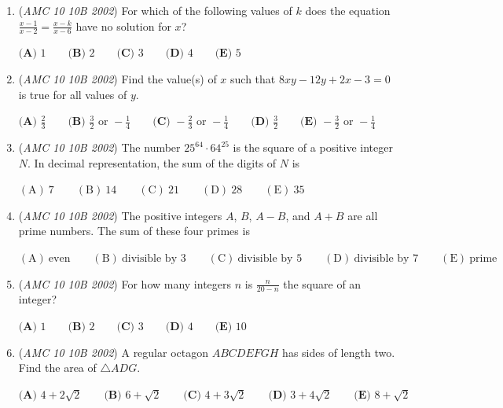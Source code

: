 \begin{enumerate}
 $\mathrm{(A) \ } 50\qquad \mathrm{(B) \ } 77\qquad \mathrm{(C) \ } 110\qquad \mathrm{(D) \ } 149\qquad \mathrm{(E) \ } 194$


	\item (\textit{AMC 10 10B 2002}) For which of the following values of $k$ does the equation $\frac{x-1}{x-2} = \frac{x-k}{x-6}$ have no solution for $x$?


 $\textbf{(A) } 1\qquad \textbf{(B) } 2\qquad \textbf{(C) } 3\qquad \textbf{(D) } 4\qquad \textbf{(E) } 5$


	\item (\textit{AMC 10 10B 2002}) Find the value(s) of $x$ such that $8xy - 12y + 2x - 3 = 0$ is true for all values of $y$.


 $\textbf{(A) } \frac23 \qquad \textbf{(B) } \frac32 \text{ or } -\frac14 \qquad \textbf{(C) } -\frac23 \text{ or } -\frac14 \qquad \textbf{(D) } \frac32 \qquad \textbf{(E) } -\frac32 \text{ or } -\frac14$


	\item (\textit{AMC 10 10B 2002}) The number $25^{64}\cdot 64^{25}$ is the square of a positive integer $N$. In decimal representation, the sum of the digits of $N$ is


 $\mathrm{(A) \ } 7\qquad \mathrm{(B) \ } 14\qquad \mathrm{(C) \ } 21\qquad \mathrm{(D) \ } 28\qquad \mathrm{(E) \ } 35$


	\item (\textit{AMC 10 10B 2002}) The positive integers $A$, $B$, $A-B$, and $A+B$ are all prime numbers. The sum of these four primes is


 $\mathrm{(A) \ } \text{even}\qquad \mathrm{(B) \ } \text{divisible by }3\qquad \mathrm{(C) \ } \text{divisible by }5\qquad \mathrm{(D) \ } \text{divisible by }7\qquad \mathrm{(E) \ } \text{prime}$


	\item (\textit{AMC 10 10B 2002}) For how many integers $n$ is $\frac{n}{20-n}$ the square of an integer?


 $\textbf{(A) } 1\qquad \textbf{(B) } 2\qquad \textbf{(C) } 3\qquad \textbf{(D) } 4\qquad \textbf{(E) } 10$


	\item (\textit{AMC 10 10B 2002}) A regular octagon $ABCDEFGH$ has sides of length two.  Find the area of $\triangle ADG$.


 $\textbf{(A) } 4 + 2\sqrt2 \qquad \textbf{(B) } 6 + \sqrt2\qquad \textbf{(C) } 4 + 3\sqrt2 \qquad \textbf{(D) } 3 + 4\sqrt2 \qquad \textbf{(E) } 8 + \sqrt2$



\end{enumerate}
